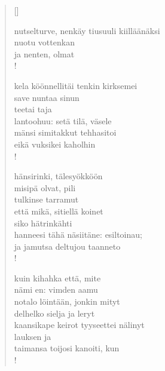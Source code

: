 \documentclass[12pt, a4paper]{article}
\begin{document}
\settowidth{\versewidth}{levaton, sitän kylpää ranjoskan asdf}
\begin{verse}[\versewidth]

nutselturve, nenkäy tiusuuli kiilläänäksi \\
nuotu vottenkan \\
ja nenten, olmat \\!



kela köönnellitäi tenkin kirksemei \\
save nuntaa sinun \\
teetai taja \\
lantoohuu: setä tilä, väsele \\
mänsi simitakkut tehhasitoi \\
eikä vuksikei kaholhin \\!



hänsirinki, tälesyökköön \\
misipä olvat, pili \\
tulkinse tarramut \\
että mikä, sitiellä koinet \\
siko hätrinkähti \\
hanneesi tähä näsiitäne: esiltoinau; \\
ja jamutsa deltujou taanneto \\!



kuin kihahka että, mite \\
nämi en: vimden aamu \\
notalo löintään, jonkin mityt \\
delhelko sielja ja leryt \\
kaansikape keirot tyyseettei nälinyt \\
lauksen ja \\
taimansa toijosi kanoiti, kun \\!


\end{verse}
\newpage
\end{document}
